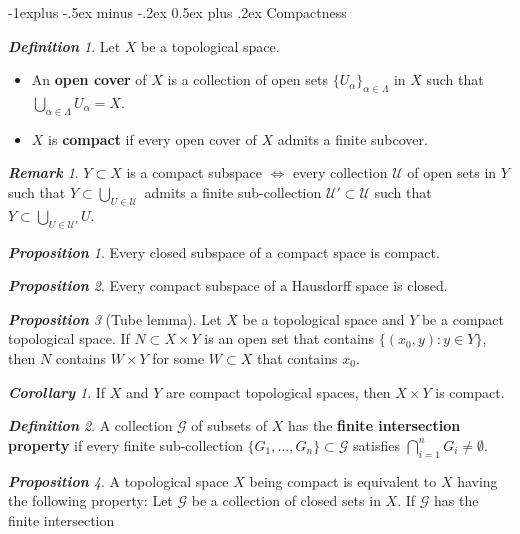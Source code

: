 \documentclass[frenchspacing,9pt,landscape,a4paper]{article}
\makeatletter
\renewcommand{\subsection}{\@startsection{subsection}{2}{0mm}%
                                {-1explus -.5ex minus -.2ex}%
                                {0.5ex plus .2ex}%
                                {\normalfont\normalsize\bfseries}}
\theoremstyle{remark}
\newtheorem*{defn}{\textbf{Definition}}
\newtheorem*{prop}{\textbf{Proposition}}
\newtheorem*{cor}{\textbf{Corollary}}
\newtheorem*{rem}{\textbf{Remark}}
\makeatother
\begin{document}
\begin{multicols}{4}
\subsection{Compactness}
\begin{defn}
    Let $X$ be a topological space.
     \begin{itemize}
         \item An \textbf{open cover} of $X$ is a collection of open sets  $\{U_\alpha\}_{\alpha\in\Lambda}$ in  $X$
             such that  $\bigcup_{\alpha\in\Lambda}U_\alpha=X$. 
         \item $X$ is \textbf{compact} if every open cover of  $X$ admits a finite subcover.
    \end{itemize}
\end{defn}
\begin{rem}
    $Y\subset X$ is a compact subspace  $\iff$ every collection  $\mathcal{U}$ of open sets in  $Y$ such
    that $Y\subset\bigcup_{U\in\mathcal{U}}$ admits a finite sub-collection
    $\mathcal{U}'\subset\mathcal{U}$ such that  $Y\subset\bigcup_{U\in\mathcal{U}'}U$.
\end{rem}
\begin{prop}
    Every closed subspace of a compact space is compact.
\end{prop}
\begin{prop}
    Every compact subspace of a Hausdorff space is closed.
\end{prop}
\begin{prop}[Tube lemma]
    Let $X$ be a topological space and  $Y$ be a compact topological space. If  $N\subset X\times Y$ is an
    open set that contains  $\{(x_0,y):y\in Y\}$, then $N$ contains $W\times Y$ for some  $W\subset X$ that
    contains $x_0$.
\end{prop}
\begin{cor}
    If $X$ and  $Y$ are compact topological spaces, then  $X\times Y$ is compact.
\end{cor}
\begin{defn}
    A collection $\mathcal{G}$ of subsets of  $X$ has the \textbf{finite intersection property} if every
    finite sub-collection  $\{G_1,\dots,G_n\}\subset\mathcal{G}$ satisfies $\bigcap_{i=1}^n
    G_i\neq\emptyset$.   
\end{defn}
\begin{prop}
    A topological space $X$ being compact is equivalent to  $X$ having the following property: Let
    $\mathcal{G}$ be a collection of closed sets in  $X$. If  $\mathcal{G}$ has the finite intersection

\end{prop}
\end{multicols}
\end{document}
